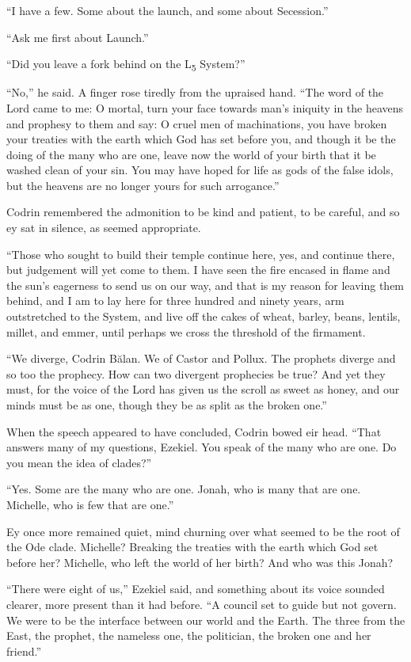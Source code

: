 ``I have a few. Some about the launch, and some about Secession.''

``Ask me first about Launch.''

``Did you leave a fork behind on the L\textsubscript{5} System?''

``No,'' he said. A finger rose tiredly from the upraised hand. ``The word of the Lord came to me: O mortal, turn your face towards man's iniquity in the heavens and prophesy to them and say: O cruel men of machinations, you have broken your treaties with the earth which God has set before you, and though it be the doing of the many who are one, leave now the world of your birth that it be washed clean of your sin. You may have hoped for life as gods of the false idols, but the heavens are no longer yours for such arrogance.''

Codrin remembered the admonition to be kind and patient, to be careful, and so ey sat in silence, as seemed appropriate.

``Those who sought to build their temple continue here, yes, and continue there, but judgement will yet come to them. I have seen the fire encased in flame and the sun's eagerness to send us on our way, and that is my reason for leaving them behind, and I am to lay here for three hundred and ninety years, arm outstretched to the System, and live off the cakes of wheat, barley, beans, lentils, millet, and emmer, until perhaps we cross the threshold of the firmament.

``We diverge, Codrin Bălan. We of Castor and Pollux. The prophets diverge and so too the prophecy. How can two divergent prophecies be true? And yet they must, for the voice of the Lord has given us the scroll as sweet as honey, and our minds must be as one, though they be as split as the broken one.''

When the speech appeared to have concluded, Codrin bowed eir head. ``That answers many of my questions, Ezekiel. You speak of the many who are one. Do you mean the idea of clades?''

``Yes. Some are the many who are one. Jonah, who is many that are one. Michelle, who is few that are one.''

Ey once more remained quiet, mind churning over what seemed to be the root of the Ode clade. Michelle? Breaking the treaties with the earth which God set before her? Michelle, who left the world of her birth? And who was this Jonah?

``There were eight of us,'' Ezekiel said, and something about its voice sounded clearer, more present than it had before. ``A council set to guide but not govern. We were to be the interface between our world and the Earth. The three from the East, the prophet, the nameless one, the politician, the broken one and her friend.''

